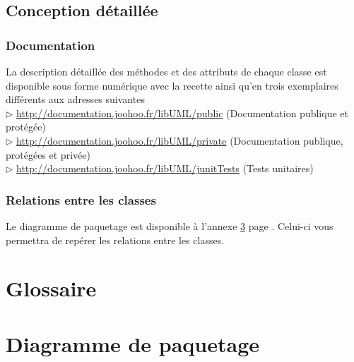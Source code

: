 \documentclass[12pt,a4paper,openany]{report}
\begin{document}
	\section{Conception détaillée}
	\subsection{Documentation}
	La description détaillée des méthodes et des attributs de chaque classe est disponible sous forme numérique
	avec la recette ainsi qu'en trois exemplaires différents aux adresses suivantes \\
	$\rhd$ \url{http://documentation.joohoo.fr/libUML/public} (Documentation publique et protégée)\\
	$\rhd$ \url{http://documentation.joohoo.fr/libUML/private} (Documentation publique, protégées et pri\-vée)\\
	$\rhd$ \url{http://documentation.joohoo.fr/libUML/junitTests} (Tests unitaires)\\	
	\subsection{Relations entre les classes}	
	Le diagramme de paquetage est disponible à l'annexe \ref{diagrammePaquetage} page \pageref{diagrammePaquetage}. Celui-ci vous permettra de repérer les 
	relations entre les classes.
	
	\appendix
	\closeout\glossaireVar
	\chapter{Glossaire}\label{glossaire}
	\begin{sortedlist}
		
	\end{sortedlist}
	\chapter{Diagramme de paquetage} \label{diagrammePaquetage}
	
\end{document}
